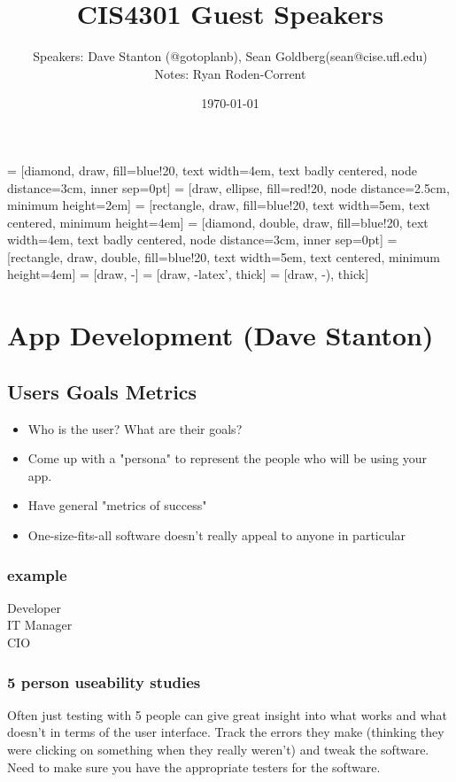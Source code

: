 \documentclass[12pt]{article}
\title{CIS4301 Guest Speakers}
\author{
  Speakers: Dave Stanton (@gotoplanb), 
  Sean Goldberg(sean@cise.ufl.edu) \\
  Notes: Ryan Roden-Corrent
}
\date{\today}
\begin{document}
\setlength\parindent{0pt}
 = [diamond, draw, fill=blue!20, text width=4em,
  text badly centered, node distance=3cm, inner sep=0pt]
 = [draw, ellipse, fill=red!20, node distance=2.5cm,
  minimum height=2em]
 = [rectangle, draw, fill=blue!20, text width=5em,
  text centered, minimum height=4em]
 = [diamond, double, draw, fill=blue!20, text width=4em,
  text badly centered, node distance=3cm, inner sep=0pt]
 = [rectangle, draw, double, fill=blue!20, text width=5em,
  text centered, minimum height=4em]
 = [draw, -]
 = [draw, -latex', thick]
 = [draw, -), thick]
\maketitle

\section{App Development (Dave Stanton)}
\subsection{Users Goals Metrics}
\begin{itemize}
  \item Who is the user? What are their goals?
  \item Come up with a "persona" to represent the people who will
    be using your app.
  \item Have general "metrics of success"
  \item One-size-fits-all software doesn't really appeal to anyone in particular
\end{itemize}

\subsubsection{example}
\begin{description}
  \item[Developer]
  \item[IT Manager]
  \item[CIO]
\end{description}

\subsubsection{5 person useability studies}
Often just testing with 5 people can give great insight into what works and
what doesn't in terms of the user interface. Track the errors they make
(thinking they were clicking on something when they really weren't) and tweak
the software. Need to make sure you have the appropriate testers for the
software.
\end{document}

